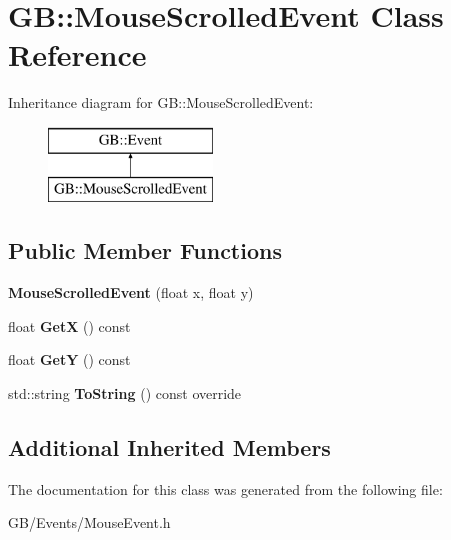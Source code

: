 \hypertarget{class_g_b_1_1_mouse_scrolled_event}{}\section{GB\+::Mouse\+Scrolled\+Event Class Reference}
\label{class_g_b_1_1_mouse_scrolled_event}
Inheritance diagram for GB\+::Mouse\+Scrolled\+Event\+:\begin{figure}[H]
\begin{center}
\leavevmode
\includegraphics[height=2.000000cm]{class_g_b_1_1_mouse_scrolled_event}
\end{center}
\end{figure}
\subsection*{Public Member Functions}
\begin{DoxyCompactItemize}
\item 
\mbox{\label{class_g_b_1_1_mouse_scrolled_event_a008656b1d6aa47ab1c9b278b28288804}} 
{\bfseries Mouse\+Scrolled\+Event} (float x, float y)
\item 
\mbox{\label{class_g_b_1_1_mouse_scrolled_event_ad3ec4d2b62c27f80eb00ace1c9490eaa}} 
float {\bfseries GetX} () const
\item 
\mbox{\label{class_g_b_1_1_mouse_scrolled_event_ad27f1e9f347c2ba44bae21800cb56d11}} 
float {\bfseries GetY} () const
\item 
\mbox{\label{class_g_b_1_1_mouse_scrolled_event_aec668e44aacffb810bcda063f6541ce8}} 
std\+::string {\bfseries To\+String} () const override
\end{DoxyCompactItemize}
\subsection*{Additional Inherited Members}


The documentation for this class was generated from the following file\+:\begin{DoxyCompactItemize}
\item 
G\+B/\+Events/Mouse\+Event.\+h\end{DoxyCompactItemize}
